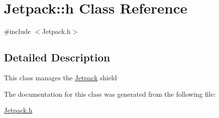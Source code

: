 \hypertarget{class_jetpack_1_1h}{}\section{Jetpack\+:\+:h Class Reference}
\label{class_jetpack_1_1h}


{\ttfamily \#include $<$Jetpack.\+h$>$}



\subsection{Detailed Description}
This class manages the \hyperlink{class_jetpack}{Jetpack} shield 

The documentation for this class was generated from the following file\+:\begin{DoxyCompactItemize}
\item 
\hyperlink{_jetpack_8h}{Jetpack.\+h}\end{DoxyCompactItemize}
